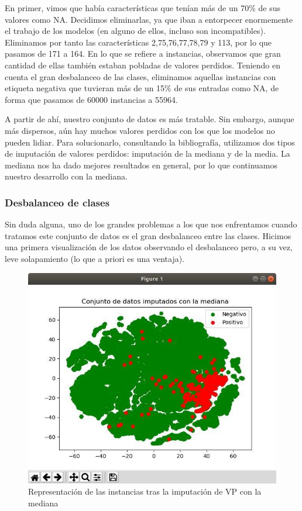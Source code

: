 En primer, vimos que había características que tenían más de un 70\% de sus valores como NA. Decidimos eliminarlas, ya que iban a entorpecer enormemente el trabajo de los modelos (en alguno de ellos, incluso son incompatibles). Eliminamos por tanto las características 2,75,76,77,78,79 y 113, por lo que pasamos de 171 a 164. En lo que se refiere a instancias, observamos que gran cantidad de ellas también estaban pobladas de valores perdidos. Teniendo en cuenta el gran desbalanceo de las clases, eliminamos aquellas instancias con etiqueta negativa que tuvieran más de un 15\% de sus entradas como NA, de forma que pasamos de 60000 instancias a 55964. 

A partir de ahí, nuestro conjunto de datos es más tratable. Sin embargo, aunque más dispersos, aún hay muchos valores perdidos con los que los modelos no pueden lidiar. Para solucionarlo, consultando la bibliografía, utilizamos dos tipos de imputación de valores perdidos: imputación de la mediana y de la media. La mediana nos ha dado mejores resultados en general, por lo que continuamos nuestro desarrollo con la mediana. 

\subsubsection{Desbalanceo de clases}

Sin duda alguna, uno de los grandes problemas a los que nos enfrentamos cuando tratamos este conjunto de datos es el gran desbalanceo entre las clases. Hicimos una primera visualización de los datos observando el desbalanceo pero, a su vez, leve solapamiento (lo que a priori es una ventaja).

\begin{figure}[H] %
		\centering
		\includegraphics[scale=0.6]{pre-smote.jpg}  %
		\caption{Representación de las instancias tras la imputación de VP con la mediana} 
	\label{fig:sep-clases}
\end{figure}

